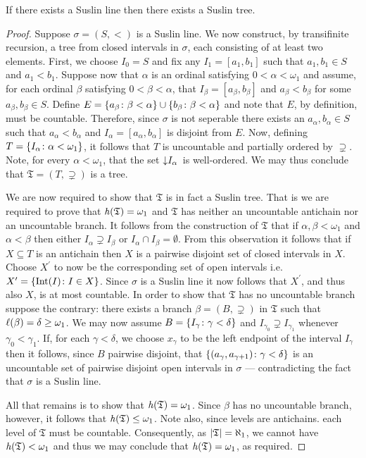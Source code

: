\begin{lem}
	If there exists a Suslin line then there exists a Suslin tree.
\end{lem}
\begin{proof}
	Suppose $\sigma=(S,<)$ is a Suslin line.  We now construct, by transifinite recursion, a tree from closed intervals in $\sigma$, each consisting of at least two elements.  First, we choose $I_0=S$ and fix any $I_1=[a_1,b_1]$ such that $a_1,b_1\in S$ and $a_1<b_1$.  Suppose now that $\alpha$ is an ordinal satisfying $0<\alpha<\omega_1$ and assume, for each ordinal $\beta$ satisfying $0<\beta<\alpha$, that $I_\beta=[a_\beta,b_\beta]$ and $a_\beta<b_\beta$ for some $a_\beta,b_\beta\in S$.  Define $E=\lbrace a_\beta\colon \beta<\alpha \rbrace\cup\lbrace b_\beta\colon \beta<\alpha \rbrace$ and note that $E$, by definition, must be countable.  Therefore, since $\sigma$ is not seperable there exists an $a_\alpha,b_\alpha\in S$ such that $a_\alpha<b_\alpha$ and $I_\alpha=[a_\alpha,b_\alpha]$ is disjoint from $E$.  Now, defining $T=\lbrace I_\alpha\colon \alpha<\omega_1 \rbrace$, it follows that $T$ is uncountable and partially ordered by $\supsetneq$.  Note, for every $\alpha<\omega_1$, that the set $\left\downarrow I_\alpha\right.$ is well-ordered.  We may thus conclude that $\mathfrak{T}=(T,\supsetneq)$ is a tree.

	We are now required to show that $\mathfrak{T}$ is in fact a Suslin tree.  That is we are required to prove that $\mathit{h}(\mathfrak{T})=\omega_1$ and $\mathfrak{T}$ has neither an uncountable antichain nor an uncountable branch.  It follows from the construction of $\mathfrak{T}$ that if $\alpha,\beta<\omega_1$ and $\alpha<\beta$ then either $I_\alpha\supsetneq I_\beta$ or $I_\alpha\cap I_\beta=\emptyset$.  From this observation it follows that if $X\subseteq T$ is an antichain then $X$ is a pairwise disjoint set of closed intervals in $X$.  Choose $X^\prime$ to now be the corresponding set of open intervals i.e.\ $X^\prime=\lbrace \operatorname{Int}(I)\colon I\in X \rbrace$.  Since $\sigma$ is a Suslin line it now follows that $X^\prime$, and thus also $X$, is at most countable.  In order to show that $\mathfrak{T}$ has no uncountable branch suppose the contrary: there exists a branch $\beta=(B,\supsetneq)$ in $\mathfrak{T}$ such that $\ell(\beta)=\delta\geq\omega_1$.  We may now assume $B=\lbrace I_\gamma\colon \gamma<\delta \rbrace$ and $I_{\gamma_0}\supsetneq I_{\gamma_1}$ whenever $\gamma_0<\gamma_1$.  If, for each $\gamma<\delta$, we choose $x_\gamma$ to be the left endpoint of the interval $I_\gamma$ then it follows, since $B$ pairwise disjoint, that $\lbrace (a_\gamma,a_{\gamma+1})\colon \gamma<\delta \rbrace$ is an uncountable set of pairwise disjoint open intervals in $\sigma$ --- contradicting the fact that $\sigma$ is a Suslin line.

	All that remains is to show that $\mathit{h}(\mathfrak{T})=\omega_1$.  Since $\beta$ has no uncountable branch, however, it follows that $\mathit{h}(\mathfrak{T})\leq\omega_1$.  Note also, since levels are antichains. each level of $\mathfrak{T}$ must be countable.  Consequently, as $\left\lvert\mathfrak{T}\right\rvert=\aleph_1$, we cannot have $\mathit{h}(\mathfrak{T})<\omega_1$ and thus we may conclude that $\mathit{h}(\mathfrak{T})=\omega_1$, as required.
\end{proof}

